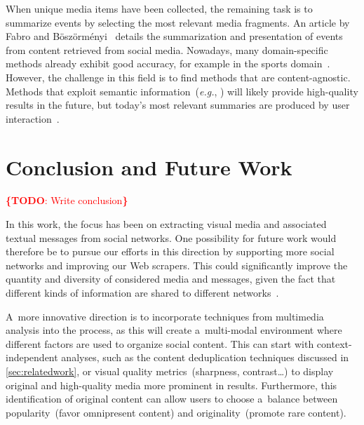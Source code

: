 \documentclass{acm_proc_article-sp}
\let\oldemph\emph
\renewcommand{\emph}[1]{\oldemph{\fontsize{9}{9}\selectfont #1}}
\newcommand{\todo}[1]{\noindent\textcolor{red}{{\bf \{TODO}: #1{\bf \}}}}
\begin{document}
When unique media items have been collected, the remaining task is to summarize events by selecting the most relevant media fragments.
An article by Fabro and B\"osz\"orm\'enyi~\cite{Fabro2012} details the summarization and presentation of events from content retrieved from social media.
Nowadays, many domain-specific methods already exhibit good accuracy, for example in the sports domain~\cite{Li1,Li2}.
However, the challenge in this field is to find methods that are content-agnostic.
Methods that exploit semantic information~(\emph{e.g.}, \cite{Chen}) will likely provide high-quality results in the future,
but today's most relevant summaries are produced by user interaction~\cite{Olsen}.


\section{Conclusion and Future Work}                                        \label{sec:conclusion}
\todo{Write conclusion}

In this work, the focus has been on extracting visual media and associated textual messages from social networks.
One possibility for future work would therefore be to pursue our efforts in this direction by supporting more social networks and improving our Web scrapers.
This could significantly improve the quantity and diversity of considered media and messages,
given the fact that different kinds of information are shared to different networks~\cite{ConsumersLook}.

A~more innovative direction is to incorporate techniques from multimedia analysis into the process,
as this will create a~multi-modal environment where different factors are used to organize social content.
This can start with context-independent analyses, such as the content deduplication techniques discussed in \autoref{sec:relatedwork},
or visual quality metrics~(sharpness, contrast\ldots) to display original and high-quality media more prominent in results.
Furthermore, this identification of original content can allow users to choose a~balance between popularity~(favor omnipresent content) and originality~(promote rare content).
\end{document}
